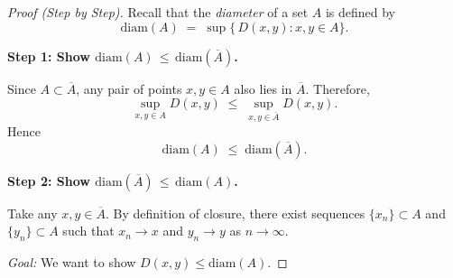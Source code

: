 \documentclass[12pt]{article}
\theoremstyle{definition} %
\theoremstyle{plain} %
\begin{document}
                            \begin{proof}[Proof (Step by Step)]
                            Recall that the \emph{diameter} of a set $A$ is defined by
                            \[
                            \mathrm{diam}(A) 
                            \;=\; 
                            \sup\{\,D(x,y) : x,y \in A\}.
                            \]
                            
                            \medskip
                            
                            \textbf{Step 1: Show $\mathrm{diam}(A) \,\le\, \mathrm{diam}(\overline{A})$.}
                            
                            Since $A \subset \overline{A}$, any pair of points $x,y \in A$ also lies in $\overline{A}$. Therefore,
                            \[
                            \sup_{x,y \in A} D(x,y)
                            \;\le\;
                            \sup_{x,y \in \overline{A}} D(x,y).
                            \]
                            Hence
                            \[
                            \mathrm{diam}(A) 
                            \;\le\; 
                            \mathrm{diam}(\overline{A}).
                            \]
                            
                            \medskip
                            
                            \textbf{Step 2: Show $\mathrm{diam}(\overline{A}) \,\le\, \mathrm{diam}(A)$.}
                            
                            Take any $x,y \in \overline{A}$. By definition of closure, there exist sequences $\{x_n\}\subset A$ and $\{y_n\}\subset A$ such that $x_n \to x$ and $y_n \to y$ as $n \to \infty$.  
                            
                            \medskip
                            
                            \textit{Goal:} We want to show $D(x,y) \le \mathrm{diam}(A)$.  
                            

\end{proof}
\end{document}
